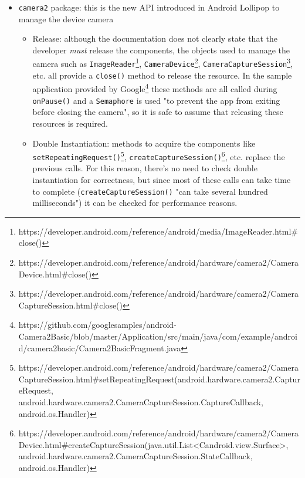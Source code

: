 \documentclass[11pt,a4paper,notitlepage]{article}
\begin{document}
\begin{itemize}
\begin{itemize}
\begin{itemize}
				\item Double Instantiation: if the developer tries to acquire the camera twice, the system will throw a runtime exception\footnote{https://developer.android.com/reference/android/hardware/Camera.html\#open(int)}.
			\end{itemize}
			\item \texttt{camera2} package: this is the new API introduced in Android Lollipop to manage the device camera
			\begin{itemize}
				\item Release: although the documentation does not clearly state that the developer \textit{must} release the components, the objects used to manage the camera such as \texttt{ImageReader}\footnote{https://developer.android.com/reference/android/media/ImageReader.html\#close()}, \texttt{CameraDevice}\footnote{https://developer.android.com/reference/android/hardware/camera2/CameraDevice.html\#close()}, \texttt{CameraCaptureSession}\footnote{https://developer.android.com/reference/android/hardware/camera2/CameraCaptureSession.html\#close()}, etc. all provide a \texttt{close()} method to release the resource. In the sample application provided by Google\footnote{https://github.com/googlesamples/android-Camera2Basic/blob/master/Application/src/main/java/com/example/android/camera2basic/Camera2BasicFragment.java} these methods are all called during \texttt{onPause()} and a \texttt{Semaphore} is used "to prevent the app from exiting before closing the camera", so it is safe to assume that releasing these resources is required.
				\item Double Instantiation: methods to acquire the components like \texttt{setRepeatingRequest()}\footnote{https://developer.android.com/reference/android/hardware/camera2/CameraCaptureSession.html\#setRepeatingRequest(android.hardware.camera2.CaptureRequest, android.hardware.camera2.CameraCaptureSession.CaptureCallback, android.os.Handler)}, \texttt{createCaptureSession()}\footnote{https://developer.android.com/reference/android/hardware/camera2/CameraDevice.html\#createCaptureSession(java.util.List<Candroid.view.Surface>, android.hardware.camera2.CameraCaptureSession.StateCallback, android.os.Handler)}, etc. replace the previous calls. For this reason, there's no need to check double instantiation for correctness, but since most of these calls can take time to complete (\texttt{createCaptureSession()} "can take several hundred milliseconds") it can be checked for performance reasons.
			\end{itemize}

\end{itemize}
\end{itemize}
\end{document}

